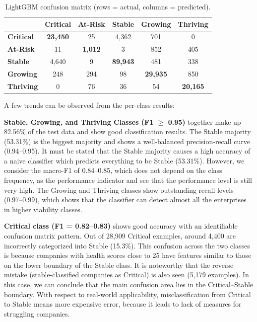 \begin{table}[htbp]
\centering
\caption{LightGBM confusion matrix (rows = actual, columns = predicted).}
\label{tab:cm_lgbm}
\begin{tabular}{lccccc}
\hline
& \textbf{Critical} & \textbf{At-Risk} & \textbf{Stable} & \textbf{Growing} & \textbf{Thriving} \\
\hline
\textbf{Critical} & \textbf{23,450} & 25 & 4,362 & 701 & 0 \\
\textbf{At-Risk} & 11 & \textbf{1,012} & 3 & 852 & 405 \\
\textbf{Stable} & 4,640 & 9 & \textbf{89,943} & 481 & 338 \\
\textbf{Growing} & 248 & 294 & 98 & \textbf{29,935} & 850 \\
\textbf{Thriving} & 0 & 76 & 36 & 54 & \textbf{20,165} \\
\hline
\end{tabular}
\end{table}

A few trends can be observed from the per-class results:

\textbf{Stable, Growing, and Thriving Classes (F1 $\geq$ 0.95)} together make up 82.56\% of the test data and show good classification results. The Stable majority (53.31\%) is the biggest majority and shows a well-balanced precision-recall curve (0.94--0.95). It must be stated that the Stable majority causes a high accuracy of a naive classifier which predicts everything to be Stable (53.31\%). However, we consider the macro-F1 of 0.84--0.85, which does not depend on the class frequency, as the performance indicator and see that the performance level is still very high. The Growing and Thriving classes show outstanding recall levels (0.97--0.99), which shows that the classifier can detect almost all the enterprises in higher viability classes.

\textbf{Critical class (F1 = 0.82--0.83)} shows good accuracy with an identifiable confusion matrix pattern. Out of 28,909 Critical examples, around 4,400 are incorrectly categorized into Stable (15.3\%). This confusion across the two classes is because companies with health scores close to 25 have features similar to those on the lower boundary of the Stable class. It is noteworthy that the reverse mistake (stable-classified companies as Critical) is also seen (5,179 examples). In this case, we can conclude that the main confusion area lies in the Critical--Stable boundary. With respect to real-world applicability, misclassification from Critical to Stable means more expensive error, because it leads to lack of measures for struggling companies.

